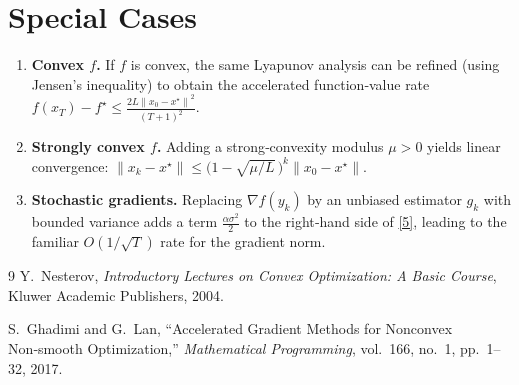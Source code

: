 \documentclass[11pt]{article}
\newcommand{\norm}[1]{\left\|#1\right\|}
\newcommand{\grad}{\nabla}
\begin{document}
\section*{Special Cases}
\begin{enumerate}[leftmargin=*]
\item \textbf{Convex $f$.} If $f$ is convex, the same Lyapunov analysis can be refined (using Jensen’s inequality) to obtain the accelerated function‑value rate $f(x_T)-f^\star\le \frac{2L\norm{x_0-x^\star}^{2}}{(T+1)^{2}}$.
\item \textbf{Strongly convex $f$.} Adding a strong‑convexity modulus $\mu>0$ yields linear convergence:
$\norm{x_k-x^\star}\le \bigl(1-\sqrt{\mu/L}\,\bigr)^{k}\norm{x_0-x^\star}$.
\item \textbf{Stochastic gradients.} Replacing $\grad f(y_k)$ by an unbiased estimator $g_k$ with bounded variance adds a term $\frac{\alpha\sigma^{2}}{2}$ to the right‑hand side of \eqref{5}, leading to the familiar $O(1/\sqrt{T})$ rate for the gradient norm.
\end{enumerate}

\begin{thebibliography}{9}
Y.~Nesterov, \emph{Introductory Lectures on Convex Optimization: A Basic Course}, Kluwer Academic Publishers, 2004.

S.~Ghadimi and G.~Lan, ``Accelerated Gradient Methods for Nonconvex Non‑smooth Optimization,'' \emph{Mathematical Programming}, vol.~166, no.~1, pp.~1–32, 2017.
\end{thebibliography}
\end{document}
